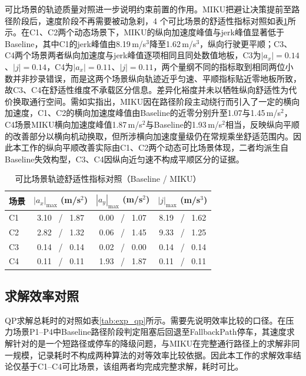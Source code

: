 \documentclass[a4paper,11pt]{ctexart}
\theoremstyle{definition}
\begin{document}
可比场景的轨迹质量对照进一步说明约束前置的作用。MIKU把避让决策提前至路径阶段后，速度阶段不再需要被动急刹，4 个可比场景的舒适性指标对照如表\ref{tab:exp_comfort}所示。在C1、C2两个动态场景下，MIKU的纵向加速度峰值与jerk峰值显著低于Baseline，其中C1的jerk峰值由8.19\,m/s$^3$降至1.62\,m/s$^3$，纵向行驶更平顺；C3、C4两个场景两者纵向加速度与jerk峰值逐项相同且同处数值地板，C3为$|a_x|=0.14$、$|j|=0.14$，C4为$|a_x|=0.11$、$|j|=0.11$，两个量纲不同的指标取到相同两位小数并非抄录错误，而是这两个场景纵向轨迹近乎匀速、平顺指标贴近零地板所致，故C3、C4在舒适性维度不承载区分信息。差异化裕度并未以牺牲纵向舒适性为代价换取通行空间。需如实指出，MIKU因在路径阶段主动绕行而引入了一定的横向加速度，C1、C2的横向加速度峰值由Baseline的近零分别升至1.07与1.45\,m/s$^2$，C4场景MIKU横向加速度峰值1.87\,m/s$^2$与Baseline的1.93\,m/s$^2$相当，反映纵向平顺的改善部分以横向机动换取，但所涉横向加速度量级仍在常规乘坐舒适范围内。因此本工作的纵向平顺改善实际由C1、C2两个动态可比场景体现，二者均派生自Baseline失效构型，C3、C4因纵向近匀速不构成平顺区分的证据。

\begin{table}[htbp]
\centering
\caption{可比场景轨迹舒适性指标对照（Baseline / MIKU）}
\label{tab:exp_comfort}
\small
\begin{tabular}{lccc}
\toprule
\textbf{场景} & \textbf{$|a_x|_{\max}$ (m/s$^2$)} & \textbf{$|a_y|_{\max}$ (m/s$^2$)} & \textbf{$|j|_{\max}$ (m/s$^3$)} \\
\midrule
C1 & 3.10 \ / \ 1.87 & 0.00 \ / \ 1.07 & 8.19 \ / \ 1.62 \\
C2 & 2.82 \ / \ 1.32 & 0.06 \ / \ 1.45 & 9.33 \ / \ 1.25 \\
C3 & 0.14 \ / \ 0.14 & 0.02 \ / \ 0.00 & 0.14 \ / \ 0.14 \\
C4 & 0.11 \ / \ 0.11 & 1.93 \ / \ 1.87 & 0.11 \ / \ 0.11 \\
\bottomrule
\end{tabular}
\end{table}

\subsection{求解效率对照}
\label{subsec:exp_qp}

QP求解总耗时的对照如表\ref{tab:exp_qp}所示。需要先说明效率比较的口径。在压力场景P1--P4中Baseline路径阶段判定阻塞后回退至FallbackPath停车，其速度求解针对的是一个短路径或停车的降级问题，与MIKU在完整通行路径上的求解非同一规模，记录耗时不构成两种算法的对等效率比较依据。因此本工作的求解效率结论仅基于C1--C4可比场景，该组两者均完成完整求解，耗时可比。
\end{document}
